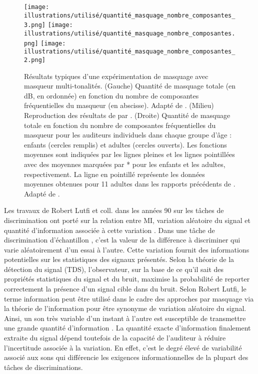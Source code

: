 \begin{figure*}[!t]
\center
\texttt{[image: illustrations/utilisé/quantité\_masquage\_nombre\_composantes\_3.png]}
\texttt{[image: illustrations/utilisé/quantité\_masquage\_nombre\_composantes.png]}
\texttt{[image: illustrations/utilisé/quantité\_masquage\_nombre\_composantes\_2.png]}
\caption[Résultats typiques d'une expérimentation de masquage avec masqueur multi-tonalités]{Résultats typiques d'une expérimentation de masquage avec masqueur multi-tonalités. (Gauche) Quantité de masquage totale (en dB, en ordonnée) en fonction du nombre de composantes fréquentielles du masqueur (en abscisse). Adapté de \cite{neff1987masking}. (Milieu) Reproduction des résultats de \cite{neff1987masking} par \cite{oh1998nonmonotonicity}. (Droite) Quantité de masquage totale en fonction du nombre de composantes fréquentielles du masqueur pour les auditeurs individuels dans chaque groupe d'âge : enfants (cercles remplis) et adultes (cercles ouverts). Les fonctions moyennes sont indiquées par les lignes pleines et les lignes pointillées avec des moyennes marquées par * pour les enfants et les adultes, respectivement. La ligne en pointillé représente les données moyennes obtenues pour 11 adultes dans les rapports précédents de \cite{oh1998nonmonotonicity}. Adapté de \cite{oh2001children}.}
\label{fig:chap2resultatsmasquageinformationnel}
\end{figure*}

Les travaux de Robert Lutfi et coll. dans les années 90 sur les tâches de discrimination ont porté sur la relation entre MI, variation aléatoire du signal et quantité d'information associée à cette variation \citep{lutfi1989informational, lutfi1990informational, lutfi1992informational}. 
Dans une tâche de discrimination d'échantillon \citep{lutfi1989informational}, c'est la valeur de la différence à discriminer qui varie aléatoirement d'un essai à l'autre. 
Cette variation fournit des informations potentielles sur les statistiques des signaux présentés. 
Selon la théorie de la détection du signal (TDS), l'observateur, sur la base de ce qu'il sait des propriétés statistiques du signal et du bruit, maximise la probabilité de reporter correctement la présence d'un signal cible dans du bruit. 
Selon Robert Lutfi, le terme information peut être utilisé dans le cadre des approches par masquage via la théorie de l'information pour être synonyme de variation aléatoire du signal. 
Ainsi, un son très variable d’un instant à l’autre est susceptible de transmettre une grande quantité d’information \citep{lutfi1988interpreting, lutfi1989informational, lutfi1990much, lutfi1990informational, lutfi1992informational}. 
La quantité exacte d'information finalement extraite du signal dépend toutefois de la capacité de l'auditeur à réduire l'incertitude associée à la variation. 
En effet, c’est le degré élevé de variabilité associé aux sons qui différencie les exigences informationnelles de la plupart des tâches de discriminations. 

